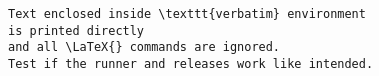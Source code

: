 \documentclass{article}
\begin{document}
\begin{verbatim}
Text enclosed inside \texttt{verbatim} environment 
is printed directly 
and all \LaTeX{} commands are ignored.
Test if the runner and releases work like intended.
\end{verbatim}
\end{document}
